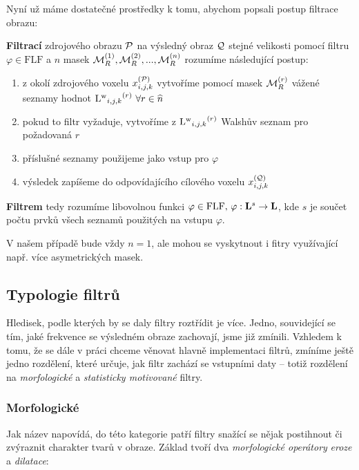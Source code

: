     Nyní už máme dostatečné prostředky k tomu, abychom popsali postup filtrace obrazu:
    \begin{define}\label{def filtr}
      \textbf{Filtrací} zdrojového obrazu $\mathcal{P}$ na výsledný obraz $\mathcal{Q}$ stejné velikosti pomocí filtru $\varphi \in \mathrm{FLF}$ a $n$ masek $\mathcal{M}_R^{(1)},\mathcal{M}_R^{(2)},...,\mathcal{M}_R^{(n)}$ rozumíme následující postup:
      \begin{enumerate}
      \item z okolí zdrojového voxelu $x_{i,j,k}^{(\mathcal{P})}$ vytvoříme pomocí masek $\mathcal{M}_R^{(r)}$ vážené seznamy hodnot ${\mathrm{L^w}_{i,j,k}}^{(r)} \,\, \forall r \in \widehat n$
      \item pokud to filtr vyžaduje, vytvoříme z ${\mathrm{L^w}_{i,j,k}}^{(r)}$ Walshův seznam pro požadovaná $r$
      \item příslušné seznamy použijeme jako vstup pro $\varphi$
      \item výsledek zapíšeme do odpovídajícího cílového voxelu $x_{i,j,k}^{(\mathcal{Q})}$
      \end{enumerate}
      \textbf{Filtrem} tedy rozumíme libovolnou funkci $\varphi \in \mathrm{FLF}, \,\varphi : \mathbf{L}^s \rightarrow \mathbf{L}$, kde $s$ je součet počtu prvků všech seznamů použitých na vstupu $\varphi$.
    \end{define}

    V našem případě bude vždy $n = 1$, ale mohou se vyskytnout i fitry využívající např. více asymetrických masek.

    \subsection{Typologie filtrů}\label{Typologie}       %

    Hledisek, podle kterých by se daly filtry roztřídit je více. Jedno, souvidející se tím, jaké frekvence se výsledném obraze zachovají, jsme již zmínili. Vzhledem k tomu, že se dále v práci chceme věnovat hlavně implementaci filtrů, zmíníme ještě jedno rozdělení, které určuje, jak filtr zachází se vstupními daty -- totiž rozdělení na \emph{morfologické} a \emph{statisticky motivované} filtry.

        \subsubsection{Morfologické}
        Jak název napovídá, do této kategorie patří filtry snažící se nějak postihnout či zvýraznit charakter tvarů v obraze. Základ tvoří dva \emph{morfologické operátory} \emph{eroze} a \emph{dilatace}:

